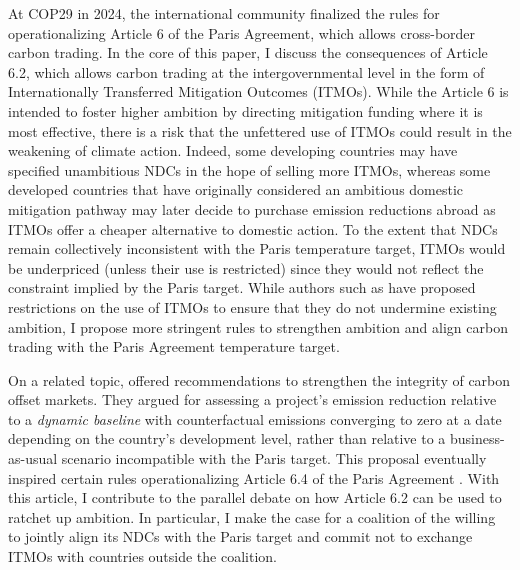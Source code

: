\documentclass[12pt,english]{article}
\begin{document}
At COP29 in 2024, the international community finalized the rules for operationalizing Article 6 of the Paris Agreement, which allows cross-border carbon trading. %
In the core of this paper, I discuss the consequences of Article 6.2, which allows carbon trading at the intergovernmental level in the form of Internationally Transferred Mitigation Outcomes (ITMOs). While the Article 6 is intended to foster higher ambition by directing mitigation funding where it is most effective, there is a risk that the unfettered use of ITMOs could result in the weakening of climate action. Indeed, some developing countries may have specified unambitious NDCs in the hope of selling more ITMOs, whereas some developed countries that have originally considered an ambitious domestic mitigation pathway may later decide to purchase emission reductions abroad as ITMOs offer a cheaper alternative to domestic action. To the extent that NDCs remain collectively inconsistent with the Paris temperature target, ITMOs would be underpriced (unless their use is restricted) since they would not reflect the constraint implied by the Paris target. While authors such as \cite{michaelowa_additionality_2019} have proposed restrictions on the use of ITMOs to ensure that they do not undermine existing ambition, I propose more stringent rules to strengthen ambition and align carbon trading with the Paris Agreement temperature target. 

On a related topic, \cite{michaelowa_towards_2022} offered recommendations to strengthen the integrity of carbon offset markets. They argued for assessing a project's emission reduction relative to a \textit{dynamic baseline} with counterfactual emissions converging to zero at a date depending on the country's development level, rather than relative to a business-as-usual scenario incompatible with the Paris target.   %
This proposal eventually inspired certain rules operationalizing Article 6.4 of the Paris Agreement \citep{unfccc_setting_2025}. 
With this article, I contribute to the parallel debate on how Article 6.2 can be used to ratchet up ambition. In particular, I make the case for a coalition of the willing to jointly %
align its NDCs with the Paris target 
and commit not to exchange ITMOs with countries outside the coalition. 
\end{document}
